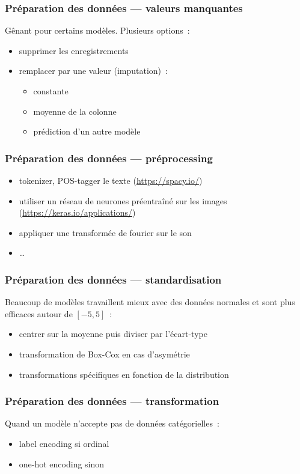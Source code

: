 \begin{frame}
  \frametitle{Préparation des données — valeurs manquantes}
  Gênant pour certains modèles. Plusieurs options :
  \begin{itemize}[<+->]
  \item supprimer les enregistrements
  \item remplacer par une valeur (imputation) :
    \begin{itemize}[<+->]
    \item constante
    \item moyenne de la colonne
    \item prédiction d'un autre modèle
    \end{itemize}
  \end{itemize}
\end{frame}

\begin{frame}
  \frametitle{Préparation des données — préprocessing}
  \begin{itemize}
  \item tokenizer, POS-tagger le texte (\url{https://spacy.io/})
  \item utiliser un réseau de neurones préentraîné sur les images
    (\url{https://keras.io/applications/})
  \item appliquer une transformée de fourier sur le son
  \item …
  \end{itemize}
\end{frame}

\begin{frame}
  \frametitle{Préparation des données — standardisation}
  Beaucoup de modèles travaillent mieux avec des données normales et
  sont plus efficaces autour de $[-5, 5]$ :
  \begin{itemize}
  \item centrer sur la moyenne puis diviser par l'écart-type
  \item transformation de Box-Cox en cas d'asymétrie
  \item transformations spécifiques en fonction de la distribution
  \end{itemize}
\end{frame}

\begin{frame}
  \frametitle{Préparation des données — transformation}
  Quand un modèle n'accepte pas de données catégorielles :
  \begin{itemize}
  \item label encoding si ordinal
  \item one-hot encoding sinon
  \end{itemize}
\end{frame}

